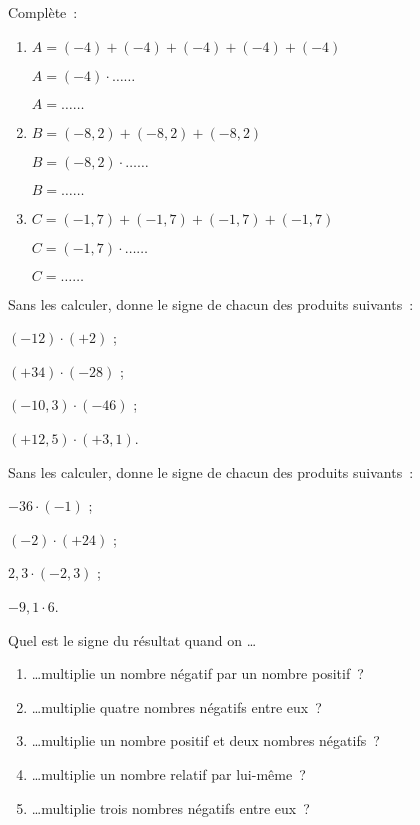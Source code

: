 

\begin{exercice}
Complète : 
\begin{enumerate}
 \item $A = (- 4) + (- 4) + (- 4) + (- 4) + (- 4)$
 
$A = (- 4) \cdot \ldots \ldots$

$A = \ldots \ldots$
 \item $B = (- 8,2) + (- 8,2) + (- 8,2)$
 
$B = (- 8,2) \cdot \ldots \ldots$

$B = \ldots \ldots$
 \item $C = (- 1,7) + (- 1,7) + (- 1,7) + (- 1,7)$

$C = (- 1,7) \cdot \ldots \ldots$

$C = \ldots \ldots$
 \end{enumerate}
\end{exercice}


\begin{exercice}
Sans les calculer, donne le signe de chacun des produits suivants :
\begin{colenumerate}{2}
 \item $(- 12) \cdot (+ 2)$ ;
 \item $(+ 34) \cdot (- 28)$ ;
 \item $(- 10,3) \cdot (- 46)$ ;
 \item $(+ 12,5) \cdot (+ 3,1)$.
 \end{colenumerate}
\end{exercice}


\begin{exercice}
Sans les calculer, donne le signe de chacun des produits suivants :
\begin{colenumerate}{2}
 \item $- 36 \cdot (- 1)$ ;
 \item $(- 2) \cdot (+ 24)$ ; 
 \item $2,3 \cdot (- 2,3)$ ;
 \item $- 9,1 \cdot 6$.
 \end{colenumerate}
\end{exercice}


\begin{exercice}
Quel est le signe du résultat quand on \ldots
\begin{enumerate}
 \item \ldots multiplie un nombre négatif par un nombre positif ?
 \item \ldots multiplie quatre nombres négatifs entre eux ?
 \item \ldots multiplie un nombre positif et deux nombres négatifs ?
 \item \ldots multiplie un nombre relatif par lui-même ?
 \item \ldots multiplie trois nombres négatifs entre eux ?
 \end{enumerate}
\end{exercice}


